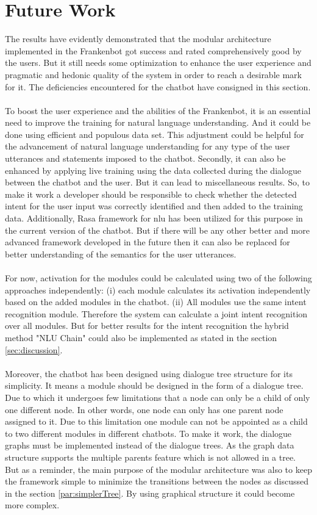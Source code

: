 \section{Future Work}
The results have evidently demonstrated that the modular architecture implemented in the Frankenbot got success and rated comprehensively good by the users. But it still needs some optimization to enhance the user experience and pragmatic and hedonic quality of the system in order to reach a desirable mark for it. The deficiencies encountered for the chatbot have consigned in this section.
\\~\\
To boost the user experience and the abilities of the Frankenbot, it is an essential need to improve the training for natural language understanding. And it could be done using efficient and populous data set. This adjustment could be helpful for the advancement of natural language understanding for any type of the user utterances and statements imposed to the chatbot. Secondly, it can also be enhanced by applying live training using the data collected during the dialogue between the chatbot and the user. But it can lead to miscellaneous results. So, to make it work a developer should be responsible to check whether the detected intent for the user input was correctly identified and then added to the training data. Additionally, Rasa framework for nlu has been utilized for this purpose in the current version of the chatbot. But if there will be any other better and more advanced framework developed in the future then it can also be replaced for better understanding of the semantics for the user utterances.
\\~\\
For now, activation for the modules could be calculated using two of the following approaches independently: (i) each module calculates its activation independently based on the added modules in the chatbot. (ii) All modules use the same intent recognition module. Therefore the system can calculate a joint intent recognition over all modules. But for better results for the intent recognition the hybrid method "NLU Chain" could also be implemented as stated in the section \ref{sec:discussion}. 
\\~\\
Moreover, the chatbot has been designed using dialogue tree structure for its simplicity. It means a module should be designed in the form of a dialogue tree. Due to which it undergoes few limitations that a node can only be a child of only one different node. In other words, one node can only has one parent node assigned to it. Due to this limitation one module can not be appointed as a child to two different modules in different chatbots. To make it work, the dialogue graphs must be implemented instead of the dialogue trees. As the graph data structure supports the multiple parents feature which is not allowed in a tree. But as a reminder, the main purpose of the modular architecture was also to keep the framework simple to minimize the transitions between the nodes as discussed in the section \ref{par:simplerTree}. By using graphical structure it could become more complex.

